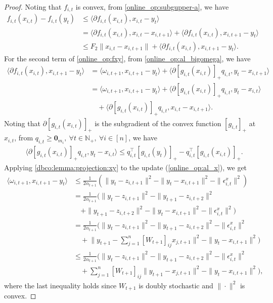 \documentclass[12pt,draftcls,onecolumn]{IEEEtran}%
\begin{document}
\begin{proof}
Noting that $f_{i,t}$ is convex, from \eqref{online_op:subgupper-a}, we have
\begin{align}\label{online_op:fxy}
f_{i,t}(x_{i,t})-f_{i,t}(y_t)&\le\langle\partial f_{i,t}(x_{i,t}),x_{i,t}-y_t\rangle\nonumber\\
&=\langle\partial f_{i,t}(x_{i,t}),x_{i,t}-x_{i,t+1}\rangle
+\langle\partial f_{i,t}(x_{i,t}),x_{i,t+1}-y_t\rangle\nonumber\\
&\le F_2\|x_{i,t}-x_{i,t+1}\|+\langle\partial f_{i,t}(x_{i,t}),x_{i,t+1}-y_t\rangle.
\end{align}
For the second term of \eqref{online_op:fxy}, from \eqref{online_op:al_bigomega}, we have
\begin{align}
\langle\partial f_{i,t}(x_{i,t}),x_{i,t+1}-y_t\rangle
&=\langle\omega_{i,t+1},x_{i,t+1}-y_t\rangle+\langle\partial [g_{i,t}(x_{i,t})]_+ q_{i,t},y_t-x_{i,t+1}\rangle
\nonumber\\
&=\langle\omega_{i,t+1},x_{i,t+1}-y_t\rangle+\langle\partial [g_{i,t}(x_{i,t})]_+ q_{i,t},y_t-x_{i,t}\rangle\nonumber\\
&\quad+\langle\partial [g_{i,t}(x_{i,t})]_+ q_{i,t},x_{i,t}-x_{i,t+1}\rangle.\label{online_op:fxy1}
\end{align}
Noting that $\partial [g_{i,t}(x_{i,t})]_+$ is the subgradient of the convex function $[g_{i,t}]_+$ at $x_{i,t}$, from $q_{i,t}\ge{\bm 0}_{m_i},~\forall t\in\mathbb{N}_+,~\forall i\in[n]$, we have
\begin{align}
&\langle\partial [g_{i,t}(x_{i,t})]_+ q_{i,t},y_t-x_{i,t}\rangle\le q_{i,t}^\top [g_{i,t}(y_{t})]_+ -q_{i,t}^\top [g_{i,t}(x_{i,t})]_+
.\label{online_op:gyxdelta}
\end{align}
Applying \eqref{dbco:lemma:projection:xy} to the update (\ref{online_op:al_x}), we get
\begin{align}
\langle\omega_{i,t+1},x_{i,t+1}-y_t\rangle
&\le\frac{1}{2\alpha_{t+1}}(\|y_t-z_{i,t+1}\|^2-\|y_t-x_{i,t+1}\|^2
-\|\epsilon^x_{i,t}\|^2)\nonumber\\
&=\frac{1}{2\alpha_{t+1}}(\|y_t-z_{i,t+1}\|^2-\|y_{t+1}-z_{i,t+2}\|^2\nonumber\\
&\quad+\|y_{t+1}-z_{i,t+2}\|^2-\|y_t-x_{i,t+1}\|^2-\|\epsilon^x_{i,t}\|^2)\nonumber\\
&=\frac{1}{2\alpha_{t+1}}\Big(\|y_t-z_{i,t+1}\|^2-\|y_{t+1}-z_{i,t+2}\|^2-\|\epsilon^x_{i,t}\|^2\nonumber\\
&\quad+\Big\|y_{t+1}-\sum_{j=1}^n[W_{t+1}]_{ij}x_{j,t+1}\Big\|^2-\|y_t-x_{i,t+1}\|^2
\Big)\nonumber\\
&\le\frac{1}{2\alpha_{t+1}}\Big(\|y_t-z_{i,t+1}\|^2-\|y_{t+1}-z_{i,t+2}\|^2-\|\epsilon^x_{i,t}\|^2\nonumber\\
&\quad+\sum_{j=1}^n[W_{t+1}]_{ij}\|y_{t+1}-x_{j,t+1}\|^2-\|y_t-x_{i,t+1}\|^2
\Big),\label{online_op:omgea2}
\end{align}
where the last inequality holds since $W_{t+1}$ is doubly stochastic and $\|\cdot\|^2$ is convex.





\end{proof}
\end{document}
